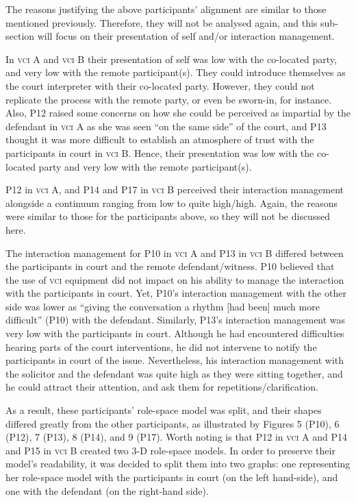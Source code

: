 \documentclass[output=paper]{langsci/langscibook}
\begin{document}
The reasons justifying the above participants’ alignment are similar to those mentioned previously. Therefore, they will not be analysed again, and this sub-section will focus on their presentation of self and/or interaction management.

In \textsc{vci} A and \textsc{vci} B their presentation of self was low with the co-located party, and very low with the remote participant(s). They could introduce themselves as the court interpreter with their co-located party. However, they could not replicate the process with the remote party, or even be sworn-in, for instance. Also, P12 raised some concerns on how she could be perceived as impartial by the defendant in \textsc{vci} A as she was seen “on the same side” of the court, and P13 thought it was more difficult to establish an atmosphere of trust with the participants in court in \textsc{vci} B. Hence, their presentation was low with the co-located party and very low with the remote participant(s).

P12 in \textsc{vci} A, and P14 and P17 in \textsc{vci} B perceived their interaction management alongside a continuum ranging from low to quite high/high. Again, the reasons were similar to those for the participants above, so they will not be discussed here. 

The interaction management for P10 in \textsc{vci} A and P13 in \textsc{vci} B differed between the participants in court and the remote defendant/witness. P10 believed that the use of \textsc{vci} equipment did not impact on his ability to manage the interaction with the participants in court. Yet, P10’s interaction management with the other side was lower as “giving the conversation a rhythm [had been] much more difficult” (P10) with the defendant. Similarly, P13’s interaction management was very low with the participants in court. Although he had encountered difficulties hearing parts of the court interventions, he did not intervene to notify the participants in court of the issue. Nevertheless, his interaction management with the solicitor and the defendant was quite high as they were sitting together, and he could attract their attention, and ask them for repetitions/clarification.

As a result, these participants’ role-space model was split, and their shapes differed greatly from the other participants, as illustrated by Figures 5 (P10), 6 (P12), 7 (P13), 8 (P14), and 9 (P17). Worth noting is that P12 in \textsc{vci} A and P14 and P15 in \textsc{vci} B created two 3-D role-space models. In order to preserve their model’s readability, it was decided to split them into two graphs: one representing her role-space model with the participants in court (on the left hand-side), and one with the defendant (on the right-hand side).
\end{document}
